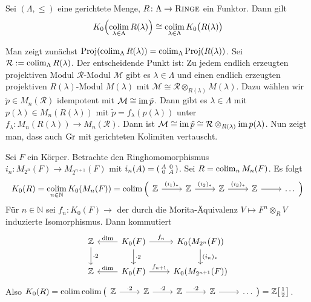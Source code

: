 \begin{satz}
	Sei $(\Lambda,\le)$ eine gerichtete Menge, $R \colon \Lambda \to \textsc{Ringe}$ ein Funktor.
	Dann gilt 
	\[
		K_0 \enbrace[\Big]{\colim_{\lambda \in \Lambda} R(\lambda)} \cong \colim_{\lambda \in \Lambda} K_0\enbrace[\big]{R(\lambda)}
	\]
\end{satz}
\begin{beweis}[Skizze]
	Man zeigt zunächst $\Proj \enbrace*{\colim_\Lambda R(\lambda)} = \colim_\Lambda \Proj \enbrace*{R(\lambda)}$.
	Sei $\mathcal{R} := \colim_\Lambda R(\lambda)$.
	Der entscheidende Punkt ist: Zu jedem endlich erzeugten projektiven Modul $\mathcal{R}$-Modul $\mathcal{M}$ gibt es $\lambda \in \Lambda$ und einen endlich erzeugten projektiven $R(\lambda)$-Modul $M(\lambda)$ mit $\mathcal{M} \cong \mathcal{R} \otimes_{R(\lambda)} M(\lambda)$.
	Dazu wählen wir $\tilde{p} \in M_n(\mathcal{R})$ idempotent mit $\mathcal{M} \cong \im \tilde{p}$.
	Dann gibt es $\lambda \in \Lambda$ mit $p(\lambda) \in M_n(R(\lambda))$ mit $\tilde{p} =f_\lambda(p(\lambda))$ unter $f_\lambda \colon M_n(R(\lambda)) \to M_n(\mathcal{R})$.
	Dann ist $\mathcal{M} \cong \im \tilde{p} \cong \mathcal{R} \otimes_{R(\lambda)} \im p(\lambda)$.
	Nun zeigt man, dass auch $\Gr$ mit gerichteten Kolimiten vertauscht.
\end{beweis}

\begin{beispiel}
	Sei $F$ ein Körper.
	Betrachte den Ringhomomorphismus $i_n \colon M_{2^n}(F) \to M_{2^{n+1}}(F)$ mit $i_n(A) = \begin{psmallmatrix} A & 0 \\ 0 & A \end{psmallmatrix}$.
	Sei $R= \colim_n M_n(F)$.
	Es folgt
	\[
		K_0(R) = \colim_{n \in \mathbb{N}} K_0 \enbrace*{M_n(F)} = \colim \Big(
		\begin{tikzcd}
			\mathbb{Z} \rar["(i_1)_*"] & \mathbb{Z} \rar["(i_2)_*"] & \mathbb{Z} \rar["(i_3)_*"]  & \mathbb{Z} \rar & \ldots 
		\end{tikzcd}
		\Big)
	\]
	Für $n \in \mathbb{N}$ sei $f_n \colon K_0(F) \to$ der durch die Morita-Äquivalenz $V \mapsto  F^n \otimes_R V$ induzierte Isomorphismus.
	Dann kommutiert
	\[
		\begin{tikzcd}
			\mathbb{Z} \dar["\cdot 2"] & K_0(F) \lar["\dim"'] \dar["\cdot 2"] \rar["f_n"] & K_0 \enbrace*{M_{2^n}(F)} \dar["(i_n)_*"] \\
			\mathbb{Z} & K_0(F) \lar["\dim"'] \rar["f_{n+1}"] & K_0 \enbrace*{M_{2^{n+1}} (F)}
		\end{tikzcd}
	\]
	Also $K_0(R) = \colim \colim \big(
		\begin{tikzcd}
			\mathbb{Z} \rar["\cdot 2"] & \mathbb{Z} \rar["\cdot 2"] & \mathbb{Z} \rar["\cdot 2"]  & \mathbb{Z} \rar & \ldots 
		\end{tikzcd}
		\big) = \mathbb{Z}\benbrace*{\frac{1}{2}}$.
\end{beispiel}
\newpage

